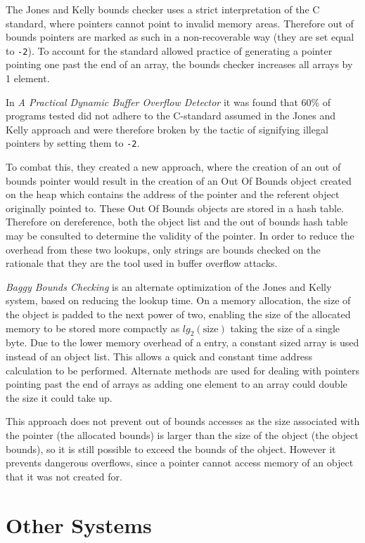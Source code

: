 The Jones and Kelly bounds checker uses a strict interpretation of the C standard, where pointers cannot point to invalid memory areas.
Therefore out of bounds pointers are marked as such in a non-recoverable way (they are set equal to \verb!-2!).
To account for the standard allowed practice of generating a pointer pointing one past the end of an array, the bounds checker increases all arrays by 1 element.

In \textit{A Practical Dynamic Buffer Overflow Detector} \cite{ruwase2004practical} it was found that 60\% of programs tested did not adhere to the C-standard assumed in the Jones and Kelly approach and were therefore broken by the tactic of signifying illegal pointers by setting them to \verb!-2!.

To combat this, they created a new approach, where the creation of an out of bounds pointer would result in the creation of an Out Of Bounds object created on the heap which contains the address of the pointer and the referent object originally pointed to.
These Out Of Bounds objects are stored in a hash table.
Therefore on dereference, both the object list and the out of bounds hash table may be consulted to determine the validity of the pointer.
In order to reduce the overhead from these two lookups, only strings are bounds checked on the rationale that they are the tool used in buffer overflow attacks.

\textit{Baggy Bounds Checking} \cite{akritidis2009baggy} is an alternate optimization of the Jones and Kelly system, based on reducing the lookup time.
On a memory allocation, the size of the object is padded to the next power of two, enabling the size of the allocated memory to be stored more compactly as $lg_2(\mbox{size})$ taking the size of a single byte.
Due to the lower memory overhead of a entry, a constant sized array is used instead of an object list.
This allows a quick and constant time address calculation to be performed.
Alternate methods are used for dealing with pointers pointing past the end of arrays as adding one element to an array could double the size it could take up.

This approach does not prevent out of bounds accesses as the size associated with the pointer (the allocated bounds) is larger than the size of the object (the object bounds), so it is still possible to exceed the bounds of the object.
However it prevents dangerous overflows, since a pointer cannot access memory of an object that it was not created for.

\section{Other Systems}

